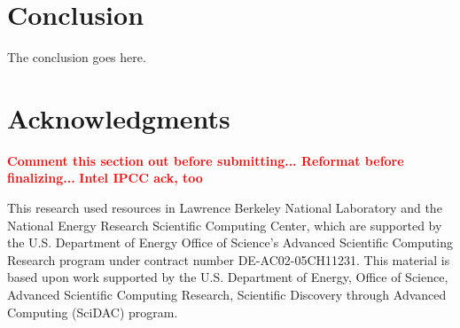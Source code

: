\documentclass[conference]{IEEEtran}
\newcommand{\fix}[1]{{\bf \textcolor {red}{#1}}}
\begin{document}
\section{Conclusion}
The conclusion goes here.


\section*{Acknowledgments}
\fix{Comment this section out before submitting... Reformat before finalizing...}
\fix{Intel IPCC ack, too}

This research used resources in Lawrence Berkeley National Laboratory and the National Energy Research Scientific Computing Center, which are supported by the U.S. Department of Energy Office of Science's Advanced Scientific Computing Research program under contract number DE-AC02-05CH11231.  
This material is based upon work supported by the U.S. Department of Energy, Office of Science, Advanced Scientific Computing Research, Scientific Discovery through Advanced Computing (SciDAC) program.








\end{document}
